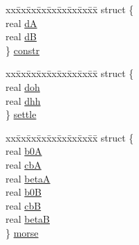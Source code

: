 \begin{DoxyCompactItemize}
\begin{tabbing}
\end{tabbing}\item 
\begin{tabbing}
xx\=xx\=xx\=xx\=xx\=xx\=xx\=xx\=xx\=\kill
struct \{\\
\>real \hyperlink{uniont__iparams_aca19251b9d45dd2930a1ece711182fd4}{dA}\\
\>real \hyperlink{uniont__iparams_ab3c14f8f5a3a4cac1c17b7faf8781a45}{dB}\\
\} \hyperlink{uniont__iparams_af62a35f32d98a9bcdef54d9505147ec3}{constr}\\

\end{tabbing}\item 
\begin{tabbing}
xx\=xx\=xx\=xx\=xx\=xx\=xx\=xx\=xx\=\kill
struct \{\\
\>real \hyperlink{uniont__iparams_add93dcbb4cbf1489f4fc3a3fb53f5df8}{doh}\\
\>real \hyperlink{uniont__iparams_abcc06078f0a3427791743279fc556b2e}{dhh}\\
\} \hyperlink{uniont__iparams_a1f0b03688ae367eb3b59b3db618c5b35}{settle}\\

\end{tabbing}\item 
\begin{tabbing}
xx\=xx\=xx\=xx\=xx\=xx\=xx\=xx\=xx\=\kill
struct \{\\
\>real \hyperlink{uniont__iparams_ae568cf478a76240c1a0c1cff5767d19d}{b0A}\\
\>real \hyperlink{uniont__iparams_a6cfc6d3761ee39e15b6f96f769c66d1a}{cbA}\\
\>real \hyperlink{uniont__iparams_aeec319aea9353f3fca670f05f67f1408}{betaA}\\
\>real \hyperlink{uniont__iparams_a0f669744375b05d166e1f9cb14728f73}{b0B}\\
\>real \hyperlink{uniont__iparams_aec16d62a49bc582489086376d01cc82d}{cbB}\\
\>real \hyperlink{uniont__iparams_af643251f80ab53eb4cf3795eea9c0308}{betaB}\\
\} \hyperlink{uniont__iparams_aeff3dd3516fac0b1e0b7dc19189def82}{morse}\\


\end{tabbing}
\end{DoxyCompactItemize}
